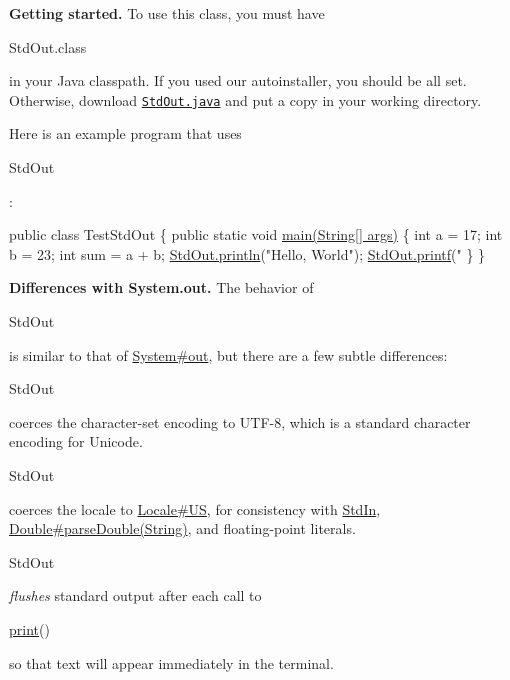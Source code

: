 {\bfseries Getting started.} To use this class, you must have
\begin{DoxyCode}
StdOut.class 
\end{DoxyCode}
 in your Java classpath. If you used our autoinstaller, you should be all set. Otherwise, download \href{http://introcs.cs.princeton.edu/java/stdlib/StdOut.java}{\tt Std\+Out.\+java} and put a copy in your working directory. 

Here is an example program that uses
\begin{DoxyCode}
StdOut 
\end{DoxyCode}
 \+: 
\begin{DoxyPre}
 public class TestStdOut \{
     public static void \hyperlink{classcom_1_1mycompany_1_1myfirstmapboxapp_1_1_std_out_a8ce973bcd3142601f1deeb0cb867a4e7}{main(String[] args)} \{
         int a = 17;
         int b = 23;
         int sum = a + b;
         \hyperlink{classcom_1_1mycompany_1_1myfirstmapboxapp_1_1_std_out_ace368f8402b27f92958c68b2c4524a45}{StdOut.println}("Hello, World");
         \hyperlink{classcom_1_1mycompany_1_1myfirstmapboxapp_1_1_std_out_a8c2a2831b1ce62a571515806ec4603b1}{StdOut.printf}("%
     \}
 \}
\end{DoxyPre}
 

{\bfseries Differences with System.\+out.} The behavior of
\begin{DoxyCode}
StdOut 
\end{DoxyCode}
 is similar to that of \hyperlink{}{System\#out}, but there are a few subtle differences\+: 
\begin{DoxyItemize}
\item 
\begin{DoxyCode}
StdOut 
\end{DoxyCode}
 coerces the character-\/set encoding to U\+T\+F-\/8, which is a standard character encoding for Unicode. 
\item 
\begin{DoxyCode}
StdOut 
\end{DoxyCode}
 coerces the locale to \hyperlink{}{Locale\#\+US}, for consistency with \hyperlink{classcom_1_1mycompany_1_1myfirstmapboxapp_1_1_std_in}{Std\+In}, \hyperlink{}{Double\#parse\+Double(\+String)}, and floating-\/point literals. 
\item 
\begin{DoxyCode}
StdOut 
\end{DoxyCode}
 {\itshape flushes} standard output after each call to 
\begin{DoxyCode}
\hyperlink{classcom_1_1mycompany_1_1myfirstmapboxapp_1_1_std_out_abbf312d71a948d2138bfaabc0ac044ce}{print}() 
\end{DoxyCode}
 so that text will appear immediately in the terminal. 
\end{DoxyItemize}

